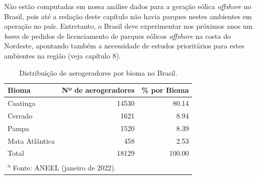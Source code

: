 \documentclass[
  oneside]{scrbook}
\begin{document}
Não estão computadas em nossa análise dados para a geração eólica \emph{offshore} no Brasil, pois até a redação deste capítulo não havia parques nestes ambientes em operação no país. Entretanto, o Brasil deve experimentar nos próximos anos um \emph{boom} de pedidos de licenciamento de parques eólicos \emph{offshore} na costa do Nordeste, apontando também a necessidade de estudos prioritários para estes ambientes na região (veja capítulo 8).

\begin{longtable}[t]{>{}lrr}
\caption{\label{tab:tab09}Distribuição de aerogeradores por bioma no Brasil.}\\
\toprule
Bioma & Nº de aerogeradores & \% por Bioma\\
\midrule
Caatinga & 14530 & 80.14\\
Cerrado & 1621 & 8.94\\
Pampa & 1520 & 8.39\\
Mata Atlântica & 458 & 2.53\\
Total & 18129 & 100.00\\
\bottomrule
\multicolumn{3}{l}{\rule{0pt}{1em}\textsuperscript{a} Fonte: ANEEL (janeiro de 2022).}\\
\end{longtable}
\end{document}
